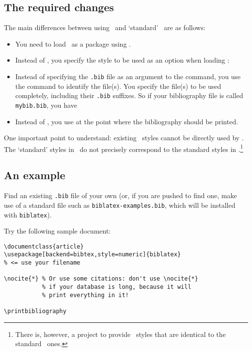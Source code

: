 \subsection{The required changes}

The main differences between using \biblatex\ and `standard' \bibtex\ are as follows:

\begin{itemize}
\item You need to load \biblatex\ as a package using .
\item Instead of , you specify the style to be used as an option when loading \biblatex:\\
\centerline{}
\item Instead of specifying the \verb|.bib| file as an argument to the  command, you use the command  to identify the file(s). You specify the file(s) to be used completely, including their \verb|.bib| suffixes. So if your bibliography file is called \verb|mybib.bib|, you have\\
\centerline{}
\item Instead of , you use  at the point where the bibliography should be printed.
\end{itemize}

One important point to understand: existing \bibtex\ styles cannot be directly used by \biblatex. The `standard' styles in \biblatex\ do not precisely correspond to the standard styles in \bibtex.\footnote{There is, however, a project to provide \biblatex\ styles that are identical to the standard \bibtex\ ones.}

\subsection{An example}

Find an existing \verb|.bib| file of your own (or, if you are pushed to find one, make use of a standard file such as \verb|biblatex-examples.bib|, which will be installed with \verb|biblatex|).

Try the following sample document:

\begin{verbatim}
\documentclass{article}
\usepackage[backend=bibtex,style=numeric]{biblatex}
% <= use your filename

\nocite{*} % Or use some citations: don't use \nocite{*}
           % if your database is long, because it will
           % print everything in it!

\printbibliography

\end{verbatim}

